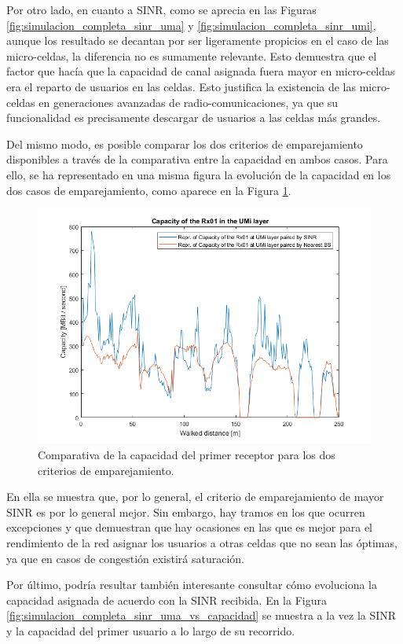 Por otro lado, en cuanto a SINR, como se aprecia en las Figuras \ref{fig:simulacion_completa_sinr_uma} y \ref{fig:simulacion_completa_sinr_umi}, aunque los resultado se decantan por ser ligeramente propicios en el caso de las micro-celdas, la diferencia no es sumamente relevante. Esto demuestra que el factor que hacía que la capacidad de canal asignada fuera mayor en micro-celdas era el reparto de usuarios en las celdas. Esto justifica la existencia de las micro-celdas en generaciones avanzadas de radio-comunicaciones, ya que su funcionalidad es precisamente descargar de usuarios a las celdas más grandes.

Del mismo modo, es posible comparar los dos criterios de emparejamiento disponibles a través de la comparativa entre la capacidad en ambos casos. Para ello, se ha representado en una misma figura la evolución de la capacidad en los dos casos de emparejamiento, como aparece en la Figura \ref{fig:simulacion_completa_sinr_umi_vs_cercano}.

\begin{figure}[h!]
	\centering
    \includegraphics[width=0.8\linewidth]{imagenes/6_2_capacidad_umi_sinr_vs_cercano.png}
	\caption{Comparativa de la capacidad del primer receptor para los dos criterios de emparejamiento.}
	\label{fig:simulacion_completa_sinr_umi_vs_cercano}
\end{figure}

En ella se muestra que, por lo general, el criterio de emparejamiento de mayor SINR es por lo general mejor. Sin embargo, hay tramos en los que ocurren excepciones y que demuestran que hay ocasiones en las que es mejor para el rendimiento de la red asignar los usuarios a otras celdas que no sean las óptimas, ya que en casos de congestión existirá saturación.

Por último, podría resultar también interesante consultar cómo evoluciona la capacidad asignada de acuerdo con la SINR recibida. En la Figura \ref{fig:simulacion_completa_sinr_uma_vs_capacidad} se muestra a la vez la SINR y la capacidad del primer usuario a lo largo de su recorrido.

